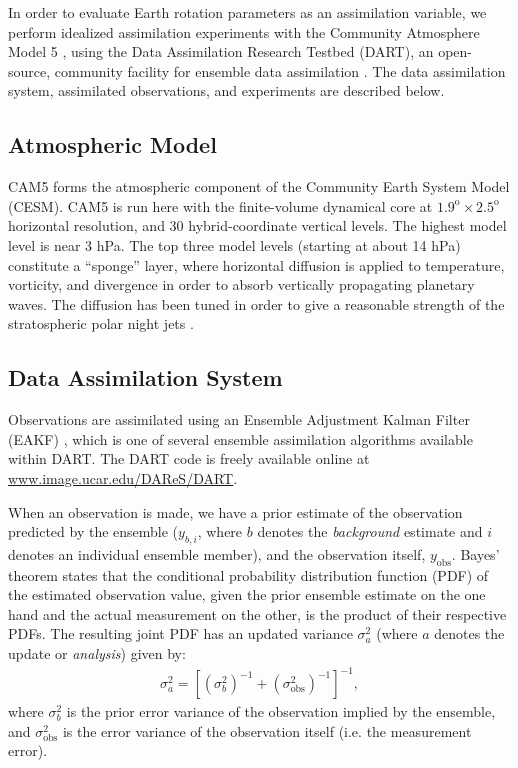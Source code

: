 In order to evaluate Earth rotation parameters as an assimilation variable, we perform idealized assimilation experiments with the Community Atmosphere Model 5 \citep[CAM5]{nealeetal2010} , using the Data Assimilation Research Testbed (DART), an open-source, community facility for ensemble data assimilation  \citep{Anderson2009, Raeder2012}.
The data assimilation system, assimilated observations, and experiments are described below. 

\subsection{Atmospheric Model}
\label{sec:CAM}
CAM5 forms the atmospheric component of the Community Earth System Model (CESM).
CAM5 is run here with the finite-volume dynamical core at $1.9^{\text{o}} \times 2.5^{\text{o}}$ horizontal resolution, and  30 hybrid-coordinate vertical levels.
The highest model level is near 3 hPa.
The top three model levels (starting at about 14 hPa) constitute a ``sponge'' layer, where horizontal diffusion is applied to temperature, vorticity, and divergence in order to absorb vertically propagating planetary waves.  
The diffusion has been tuned in order to give a reasonable strength of the stratospheric polar night jets \citep{nealeetal2010}.



\subsection{Data Assimilation System}
\label{sec:DAS}
Observations are assimilated using an Ensemble Adjustment Kalman Filter (EAKF) \citep{anderson2001}, which is one of several ensemble assimilation algorithms available within DART.
The DART code is freely available online at \url{www.image.ucar.edu/DAReS/DART}.

When an observation is made, we have a prior estimate of the observation predicted by the ensemble ($y_{b,i}$, where $b$ denotes the \textit{background} estimate and $i$ denotes an individual ensemble member), and the observation itself, $y_{\text{obs}}$.
Bayes' theorem states that the conditional probability distribution function (PDF) of the estimated observation value, given the prior ensemble estimate on the one hand and the actual measurement on the other, is the product of their respective PDFs.
The resulting joint PDF has an updated variance $\sigma_a^2$  (where $a$ denotes the update or \textit{analysis})
given by:
\begin{eqnarray}
 \sigma_a^2 = 
\left[
\left( \sigma_b^2  \right)^{-1}+
\left( \sigma_{\text{obs}}^2  \right)^{-1}
\right]^{-1},
\label{eq:sigma_a}
\end{eqnarray}
where $\sigma_b^2$ is  the prior error variance of the observation implied by the ensemble, and $\sigma_{\text{obs}}^2$ is the error variance of the observation itself (i.e. the measurement error).

